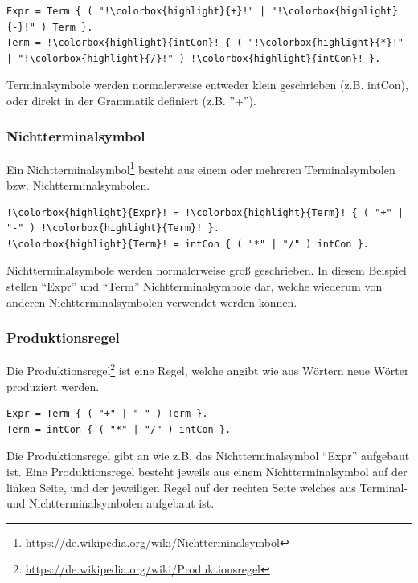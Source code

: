 \begin{lstlisting}[language=EBNF, escapechar=!]
Expr = Term { ( "!\colorbox{highlight}{+}!" | "!\colorbox{highlight}{-}!" ) Term }.
Term = !\colorbox{highlight}{intCon}! { ( "!\colorbox{highlight}{*}!" | "!\colorbox{highlight}{/}!" ) !\colorbox{highlight}{intCon}! }.
\end{lstlisting}

Terminalsymbole werden normalerweise entweder klein geschrieben (z.B. intCon), oder direkt in der Grammatik definiert (z.B. ''+'').

\subsubsection{Nichtterminalsymbol}

Ein Nichtterminalsymbol\footnote{\url{https://de.wikipedia.org/wiki/Nichtterminalsymbol}} besteht aus einem oder mehreren Terminalsymbolen bzw. Nichtterminalsymbolen.

\begin{lstlisting}[language=EBNF, escapechar=!]
!\colorbox{highlight}{Expr}! = !\colorbox{highlight}{Term}! { ( "+" | "-" ) !\colorbox{highlight}{Term}! }.
!\colorbox{highlight}{Term}! = intCon { ( "*" | "/" ) intCon }.
\end{lstlisting}

Nichtterminalsymbole werden normalerweise gro\ss{} geschrieben. In diesem Beispiel stellen ``Expr'' und ``Term'' Nichtterminalsymbole dar, welche wiederum von anderen Nichtterminalsymbolen verwendet werden k\"onnen.

\subsubsection{Produktionsregel}

Die Produktionsregel\footnote{\url{https://de.wikipedia.org/wiki/Produktionsregel}} ist eine Regel, welche angibt wie aus W\"ortern neue W\"orter produziert werden.

\begin{lstlisting}[language=EBNF, backgroundcolor=\color{highlight}]
Expr = Term { ( "+" | "-" ) Term }.
Term = intCon { ( "*" | "/" ) intCon }.
\end{lstlisting}

Die Produktionsregel gibt an wie z.B. das Nichtterminalsymbol ``Expr'' aufgebaut ist. Eine Produktionsregel besteht jeweils aus einem Nichtterminalsymbol auf der linken Seite, und der jeweiligen Regel auf der rechten Seite welches aus Terminal- und Nichtterminalsymbolen aufgebaut ist.

